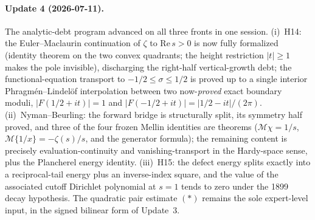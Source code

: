 \documentclass[11pt,a4paper]{article}
\begin{document}
\paragraph{Update 4 (2026-07-11).} The analytic-debt program advanced on all
three fronts in one session. (i)~H14: the Euler--Maclaurin continuation of
$\zeta$ to $\mathrm{Re}\,s>0$ is now fully formalized (identity theorem on the
two convex quadrants; the height restriction $|t|\ge 1$ makes the pole
invisible), discharging the right-half vertical-growth debt; the
functional-equation transport to $-1/2\le\sigma\le 1/2$ is proved up to a
single interior Phragm\'en--Lindel\"of interpolation between two now-\emph{proved}
exact boundary moduli, $|F(1/2+it)|=1$ and $|F(-1/2+it)|=|1/2-it|/(2\pi)$.
(ii)~Nyman--Beurling: the forward bridge is structurally split, its symmetry
half proved, and three of the four frozen Mellin identities are theorems
($\mathcal M\chi=1/s$, $\mathcal M\{1/x\}=-\zeta(s)/s$, and the generator
formula); the remaining content is precisely evaluation-continuity and
vanishing-transport in the Hardy-space sense, plus the Plancherel energy
identity. (iii)~H15: the defect energy splits exactly into a reciprocal-tail
energy plus an inverse-index square, and the value of the associated cutoff
Dirichlet polynomial at $s=1$ tends to zero under the 1899 decay hypothesis.
The quadratic pair estimate $(\ast)$ remains the sole expert-level input, in
the signed bilinear form of Update~3.
\end{document}
